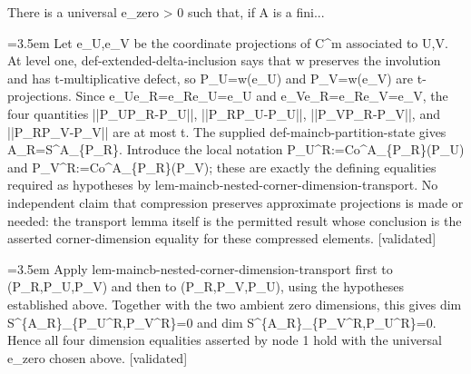 \documentclass{article}
\newcommand{\step}[1]{\par\noindent\hangindent=3.5em\hangafter=1%
  \makebox[3.5em][l]{\textbf{#1.}}}
\newcommand{\steptag}[1]{\hfill{\small\textsf{[#1]}}}
\begin{document}
\begin{proofbox}{There is a universal e\_zero > 0 such that, if A is a fini...}
\step{1.4.2} Let e\_U,e\_V be the coordinate projections of C\textasciicircum{}m associated to U,V. At level one, def-extended-delta-inclusion says that w preserves the involution and has t-multiplicative defect, so P\_U=w(e\_U) and P\_V=w(e\_V) are t-projections. Since e\_Ue\_R=e\_Re\_U=e\_U and e\_Ve\_R=e\_Re\_V=e\_V, the four quantities ||P\_UP\_R-P\_U||, ||P\_RP\_U-P\_U||, ||P\_VP\_R-P\_V||, and ||P\_RP\_V-P\_V|| are at most t. The supplied def-maincb-partition-state gives A\_R=S\textasciicircum{}A\_\{P\_R\}. Introduce the local notation P\_U\textasciicircum{}R:=Co\textasciicircum{}A\_\{P\_R\}(P\_U) and P\_V\textasciicircum{}R:=Co\textasciicircum{}A\_\{P\_R\}(P\_V); these are exactly the defining equalities required as hypotheses by lem-maincb-nested-corner-dimension-transport. No independent claim that compression preserves approximate projections is made or needed: the transport lemma itself is the permitted result whose conclusion is the asserted corner-dimension equality for these compressed elements. \steptag{validated} \\[4pt]
\step{1.5} Apply lem-maincb-nested-corner-dimension-transport first to (P\_R,P\_U,P\_V) and then to (P\_R,P\_V,P\_U), using the hypotheses established above. Together with the two ambient zero dimensions, this gives dim S\textasciicircum{}\{A\_R\}\_\{P\_U\textasciicircum{}R,P\_V\textasciicircum{}R\}=0 and dim S\textasciicircum{}\{A\_R\}\_\{P\_V\textasciicircum{}R,P\_U\textasciicircum{}R\}=0. Hence all four dimension equalities asserted by node 1 hold with the universal e\_zero chosen above. \steptag{validated} \\[4pt]

\end{proofbox}
\end{document}

